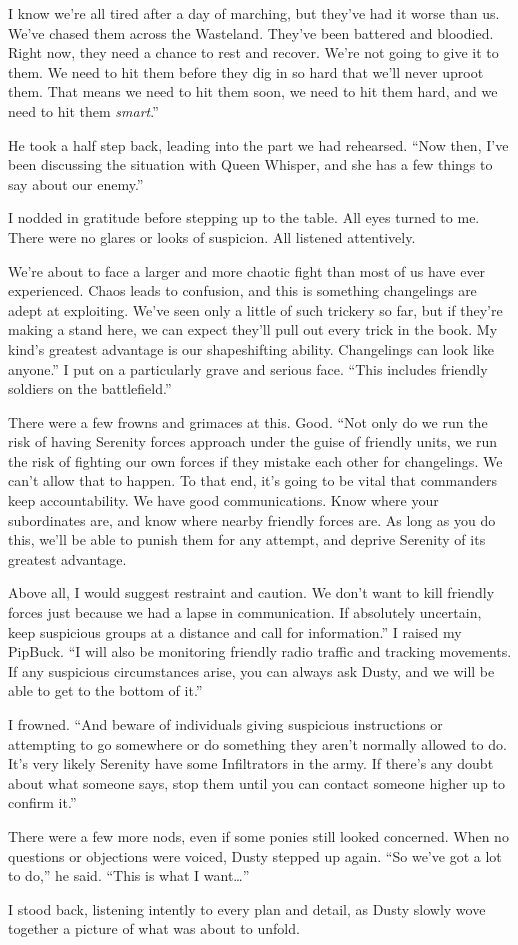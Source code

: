 \leavevmode{}I know we’re all tired after a day of marching, but they’ve had it worse than us. We’ve chased them across the Wasteland. They’ve been battered and bloodied. Right now, they need a chance to rest and recover. We’re not going to give it to them. We need to hit them before they dig in so hard that we’ll never uproot them. That means we need to hit them soon, we need to hit them hard, and we need to hit them \textit{smart}.”

He took a half step back, leading into the part we had rehearsed. “Now then, I’ve been discussing the situation with Queen Whisper, and she has a few things to say about our enemy.”

I nodded in gratitude before stepping up to the table. All eyes turned to me. There were no glares or looks of suspicion. All listened attentively.

\leavevmode{}We’re about to face a larger and more chaotic fight than most of us have ever experienced. Chaos leads to confusion, and this is something changelings are adept at exploiting. We’ve seen only a little of such trickery so far, but if they’re making a stand here, we can expect they’ll pull out every trick in the book. My kind’s greatest advantage is our shapeshifting ability. Changelings can look like anyone.” I put on a particularly grave and serious face. “This includes friendly soldiers on the battlefield.”

There were a few frowns and grimaces at this. Good. “Not only do we run the risk of having Serenity forces approach under the guise of friendly units, we run the risk of fighting our own forces if they mistake each other for changelings. We can’t allow that to happen. To that end, it’s going to be vital that commanders keep accountability. We have good communications. Know where your subordinates are, and know where nearby friendly forces are. As long as you do this, we’ll be able to punish them for any attempt, and deprive Serenity of its greatest advantage.

\leavevmode{}Above all, I would suggest restraint and caution. We don’t want to kill friendly forces just because we had a lapse in communication. If absolutely uncertain, keep suspicious groups at a distance and call for information.” I raised my PipBuck. “I will also be monitoring friendly radio traffic and tracking movements. If any suspicious circumstances arise, you can always ask Dusty, and we will be able to get to the bottom of it.”

I frowned. “And beware of individuals giving suspicious instructions or attempting to go somewhere or do something they aren’t normally allowed to do. It’s very likely Serenity have some Infiltrators in the army. If there’s any doubt about what someone says, stop them until you can contact someone higher up to confirm it.”

There were a few more nods, even if some ponies still looked concerned. When no questions or objections were voiced, Dusty stepped up again. “So we’ve got a lot to do,” he said. “This is what I want…”

I stood back, listening intently to every plan and detail, as Dusty slowly wove together a picture of what was about to unfold.